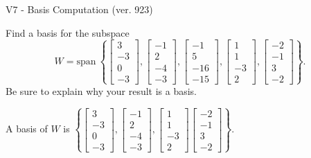 \begin{exercise}
  \begin{exerciseTitle}V7 - Basis Computation (ver. 923)\end{exerciseTitle}
  \begin{exerciseStatement}
    Find a basis for the subspace 
\[W=\mathrm{span}\ \left\{\left[\begin{array}{r}
3 \\
-3 \\
0 \\
-3
\end{array}\right] , \left[\begin{array}{r}
-1 \\
2 \\
-4 \\
-3
\end{array}\right] , \left[\begin{array}{r}
-1 \\
5 \\
-16 \\
-15
\end{array}\right] , \left[\begin{array}{r}
1 \\
1 \\
-3 \\
2
\end{array}\right] , \left[\begin{array}{r}
-2 \\
-1 \\
3 \\
-2
\end{array}\right]\right\}.\]
 Be sure to explain why your result is a basis.


  \end{exerciseStatement}
  \begin{exerciseAnswer}
   A basis of \(W\) is  \(\left\{\left[\begin{array}{r}
3 \\
-3 \\
0 \\
-3
\end{array}\right] , \left[\begin{array}{r}
-1 \\
2 \\
-4 \\
-3
\end{array}\right] , \left[\begin{array}{r}
1 \\
1 \\
-3 \\
2
\end{array}\right] \left[\begin{array}{r}
-2 \\
-1 \\
3 \\
-2
\end{array}\right]\right\}\).
  


  \end{exerciseAnswer}
\end{exercise}